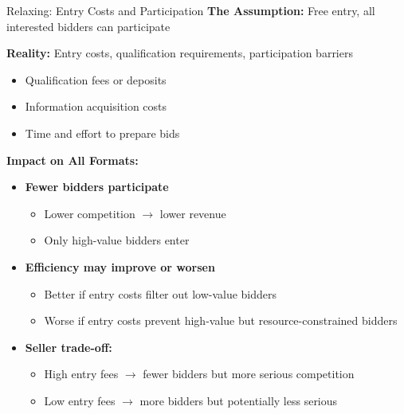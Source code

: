 \documentclass[xcolor={x11names}]{beamer}
\begin{document}
\begin{frame}{Relaxing: Entry Costs and Participation}
\textbf{The Assumption:} Free entry, all interested bidders can participate


\textbf{Reality:} Entry costs, qualification requirements, participation barriers
\begin{itemize}
  \item Qualification fees or deposits
  \item Information acquisition costs
  \item Time and effort to prepare bids
\end{itemize}


\textbf{Impact on All Formats:}
\begin{itemize}
  \item \textbf{Fewer bidders participate}
  \begin{itemize}
    \item Lower competition $\rightarrow$ lower revenue
    \item Only high-value bidders enter
  \end{itemize}
  \item \textbf{Efficiency may improve or worsen}
  \begin{itemize}
    \item Better if entry costs filter out low-value bidders
    \item Worse if entry costs prevent high-value but resource-constrained bidders
  \end{itemize}
  \item \textbf{Seller trade-off:}
  \begin{itemize}
    \item High entry fees $\rightarrow$ fewer bidders but more serious competition
    \item Low entry fees $\rightarrow$ more bidders but potentially less serious
  \end{itemize}
\end{itemize}
\end{frame}
\end{document}
